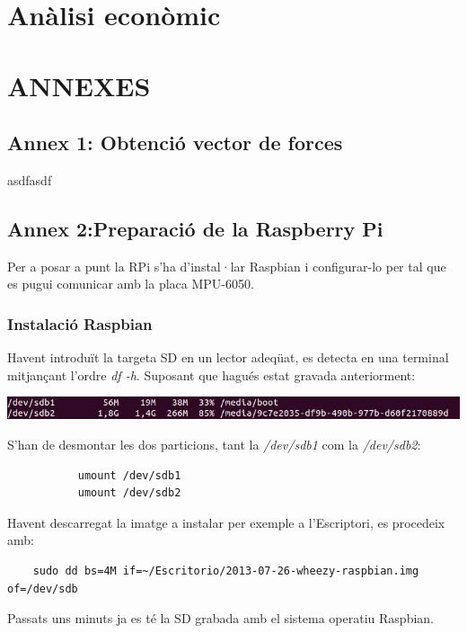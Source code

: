 \documentclass[twoside]{article}
\begin{document}

\newpage
\section{Anàlisi econòmic}

\newpage
\section*{ANNEXES}
\subsection*{Annex 1: Obtenció vector de forces}
asdfasdf 
\newpage

\subsection*{Annex 2:Preparació de la Raspberry Pi}
Per a posar a punt la RPi s'ha d'instal·lar Raspbian i configurar-lo per tal que es pugui comunicar amb la placa MPU-6050.
\subsubsection*{Instalació Raspbian}
Havent introduït la targeta SD en un lector adeqüat, es detecta en una terminal mitjançant l'ordre \textit{df -h}. Suposant que hagués estat gravada anteriorment:
\begin{center}
\includegraphics[scale=0.7]{images/InstalRasp1.jpeg}
\end{center}
S'han de desmontar les dos particions, tant la \textit{/dev/sdb1} com la \textit{/dev/sdb2}:
\begin{verbatim}
           umount /dev/sdb1
           umount /dev/sdb2
\end{verbatim}
Havent descarregat la imatge a instalar per exemple a l'Escriptori, es procedeix amb:
\begin{verbatim}
    sudo dd bs=4M if=~/Escritorio/2013-07-26-wheezy-raspbian.img of=/dev/sdb
\end{verbatim}
Passats uns minuts ja es té la SD grabada amb el sistema operatiu Raspbian.
\end{document}
